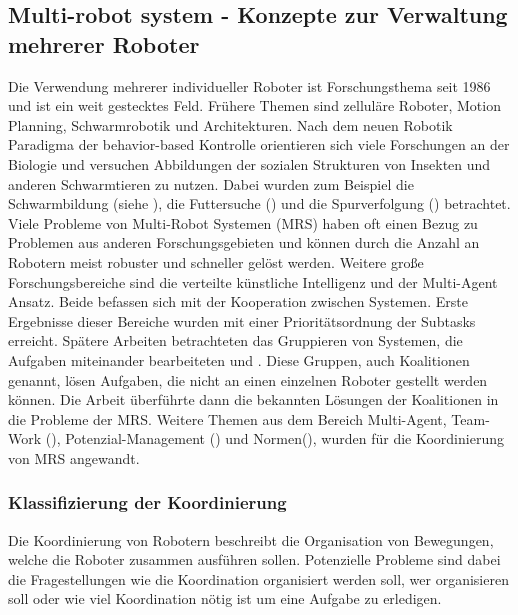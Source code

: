\subsection{Multi-robot system - Konzepte zur Verwaltung mehrerer Roboter}
\label{sec:relatedwork-multirobots}
    
Die Verwendung mehrerer individueller Roboter ist Forschungsthema seit 1986 und ist ein weit gestecktes Feld. Frühere Themen sind zelluläre Roboter, Motion Planning, Schwarmrobotik und Architekturen. Nach dem neuen Robotik Paradigma der behavior-based Kontrolle orientieren sich viele Forschungen an der Biologie und versuchen Abbildungen der sozialen Strukturen von Insekten und anderen Schwarmtieren zu nutzen.\cite{parker2003current} Dabei wurden zum Beispiel die Schwarmbildung (siehe \cite{hayes2002self}), die Futtersuche (\cite{balch1999impact}) und die Spurverfolgung (\cite{vaughan2000whistling}) betrachtet. Viele Probleme von Multi-Robot Systemen (MRS) haben oft einen Bezug zu Problemen aus anderen Forschungsgebieten und können durch die Anzahl an Robotern meist robuster und schneller gelöst werden. Weitere große Forschungsbereiche sind die verteilte künstliche Intelligenz und der Multi-Agent Ansatz. Beide befassen sich mit der Kooperation zwischen Systemen. Erste Ergebnisse dieser Bereiche wurden mit einer Prioritätsordnung der Subtasks erreicht\cite{durfee1987coherent}. Spätere Arbeiten betrachteten das Gruppieren von Systemen, die Aufgaben miteinander bearbeiteten \cite{shehory1998methods} und \cite{lau2003task}. Diese Gruppen, auch Koalitionen genannt, lösen Aufgaben, die nicht an einen einzelnen Roboter gestellt werden können. Die Arbeit \cite{vig2005issues} überführte dann die bekannten Lösungen der Koalitionen in die Probleme der MRS. Weitere Themen aus dem Bereich Multi-Agent, Team-Work (\cite{pynadath2003automated}), Potenzial-Management (\cite{timm2003ontology}) und Normen(\cite{boella2002norms}), wurden für die Koordinierung von MRS angewandt.\cite{lundh2006plan}

\subsubsection{Klassifizierung der Koordinierung}
Die Koordinierung von Robotern beschreibt die Organisation von Bewegungen, welche die Roboter zusammen ausführen sollen. Potenzielle Probleme sind dabei die Fragestellungen wie die Koordination organisiert werden soll, wer organisieren soll oder wie viel Koordination nötig ist um eine Aufgabe zu erledigen.

